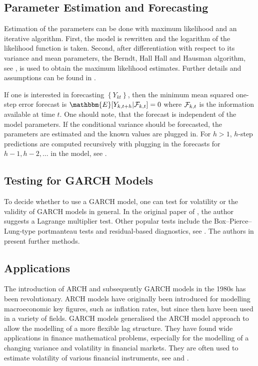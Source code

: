 \subsection{Parameter Estimation and Forecasting}
\label{sec: GARCH Parameter Estimation and Forecasting}

Estimation of the parameters can be done with maximum likelihood and an iterative algorithm. First, the model is rewritten and the logarithm of the likelihood function is taken. Second, after differentiation with respect to its variance and mean parameters, the Berndt, Hall Hall and Hausman algorithm, see \textcite{Berndt:1974}, is used to obtain the maximum likelihood estimates. Further details and assumptions can be found in \textcite{Bollerslev:1986}. 

If one is interested in forecasting $\left\{Y_{kt}\right\}$, then the minimum mean squared one-step error forecast is $\mathbbm{E}[Y_{k,t+h}|\SigA_{k,t}]=0$ where $\mathcal{F}_{k,t}$ is the information available at time $t$. One should note, that the forecast is independent of the model parameters. If the conditional variance should be forecasted, the parameters are estimated and the known values are plugged in. For $h>1$, $h$-step predictions are computed recursively with plugging in the forecasts for $h-1,h-2,\ldots$ in the model, see \textcite{Zivot:2009}. 


\subsection{Testing for GARCH Models}
\label{sec: Testing for GARCH models}

To decide whether to use a GARCH model, one can test for volatility or the validity of GARCH models in general. In the original paper of \textcite{Bollerslev:1986}, the author suggests a Lagrange multiplier test. Other popular tests include the Box–Pierce–Lung‐type portmanteau tests and residual‐based diagnostics, see \textcite{Hong:2017}. The authors in \textcite{Hong:2017} present further methods. 


\subsection{Applications}
\label{sec: Garch Applications}

The introduction of ARCH and subsequently GARCH models in the 1980s has been revolutionary. ARCH models have originally been introduced for modelling macroeconomic key figures, such as inflation rates, but since then have been used in a variety of fields. GARCH models generalised the ARCH model approach to allow the modelling of a more flexible lag structure. They have found wide applications in finance mathematical problems, especially for the modelling of a changing variance and volatility in financial markets. They are often used to estimate volatility of various financial instruments, see \textcite{Bollerslev:1986} and \textcite{Kreiss:2006}. 

